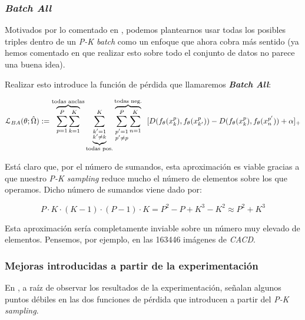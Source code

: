 \subsubsection{\textit{Batch All}} \label{isubsubs:batch_all}

Motivados por lo comentado en , podemos plantearnos usar todas los posibles triples dentro de un \textit{P-K batch} como un enfoque que ahora cobra más sentido (ya hemos comentado en  que realizar esto sobre todo el conjunto de datos no parece una buena idea).

Realizar esto introduce la función de pérdida que llamaremos \textbf{\textit{Batch All}}:

\begin{equation} \label{ieq:batch_all}
    \mathcal{L}_{BA}(\theta; \hat{\Omega}) :=
    \overbrace{\sum_{p = 1}^{P} \sum_{k = 1}^K}^\textrm{\text{todas anclas}}
    \underbrace{\sum_{\substack{k' = 1 \\ k' \neq k}}^{K}}_\textrm{\text{todas pos.}}
    \overbrace{\sum_{\substack{p' = 1 \\ p' \neq p}}^P \sum_{n = 1}^K}^\textrm{\text{todas neg.}} \ \ [
        D(f_{\theta}(x_k^p),f_{\theta}(x_{k'}^p)) - D(f_{\theta}(x_k^p),f_{\theta}(x_{n}^{p'})) + \alpha
    ]_+
\end{equation}

Está claro que, por el número de sumandos, esta aproximación es viable gracias a que nuestro \textit{P-K sampling} reduce mucho el número de elementos sobre los que operamos. Dicho número de sumandos viene dado por:

\begin{equation}
    P \cdot K \cdot (K - 1) \cdot (P - 1) \cdot K = P^2 - P + K^3 - K^2 \approx P^2 + K^3
\end{equation}

Esta aproximación sería completamente inviable sobre un número muy elevado de elementos. Pensemos, por ejemplo, en las 163446 imágenes de \textit{CACD}.

\subsubsection{Mejoras introducidas a partir de la experimentación} \label{isubsubs:mejoras_sumandos_no_nulos}

En \cite{informatica:principal}, a raíz de observar los resultados de la experimentación, señalan algunos puntos débiles en las dos funciones de pérdida que introducen a partir del \textit{P-K sampling}.

